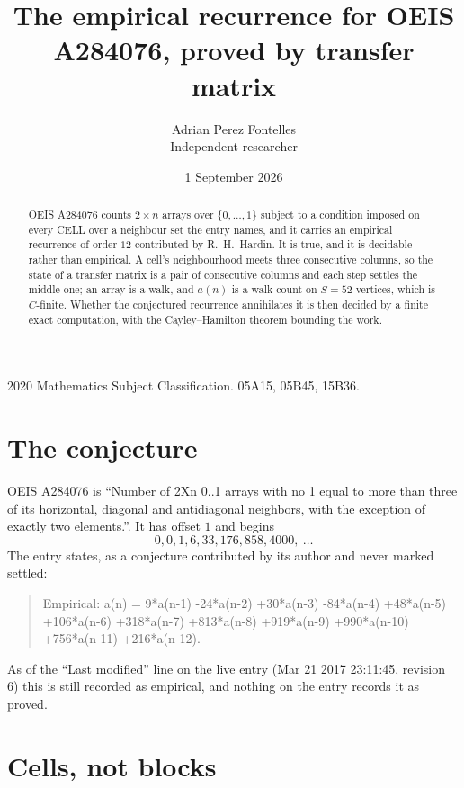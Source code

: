 \documentclass[11pt,a4paper]{article}
\title{The empirical recurrence for OEIS A284076, proved by transfer matrix}
\author{Adrian Perez Fontelles\\ \small Independent researcher}
\date{1 September 2026}
\theoremstyle{plain}
\theoremstyle{definition}
\begin{document}
\maketitle

\begin{abstract}
OEIS A284076 counts $2\times n$ arrays over $\{0,\dots,1\}$ subject to a condition imposed on
every CELL over a neighbour set the entry names, and it carries an empirical recurrence of
order $12$ contributed by R.~H.~Hardin. It is true, and it is decidable rather than
empirical. A cell's neighbourhood meets three consecutive columns, so the state of a transfer
matrix is a pair of consecutive columns and each step settles the middle one; an array is a
walk, and $a(n)$ is a walk count on $S=52$ vertices, which is $C$-finite. Whether the
conjectured recurrence annihilates it is then decided by a finite exact computation, with the
Cayley--Hamilton theorem bounding the work.
\end{abstract}

\noindent\small 2020 Mathematics Subject Classification. 05A15, 05B45, 15B36.\normalsize

\section{The conjecture}

OEIS A284076 is ``Number of 2Xn 0..1 arrays with no 1 equal to more than three of its horizontal, diagonal and antidiagonal neighbors, with the exception of exactly two elements.''. It has offset $1$ and begins
\[
0, 0, 1, 6, 33, 176, 858, 4000,\ \dots
\]
The entry states, as a conjecture contributed by its author and never marked settled:
\begin{quote}
Empirical: a(n) = 9*a(n-1) -24*a(n-2) +30*a(n-3) -84*a(n-4) +48*a(n-5) +106*a(n-6) +318*a(n-7) +813*a(n-8) +919*a(n-9) +990*a(n-10) +756*a(n-11) +216*a(n-12).
\end{quote}
As of the ``Last modified'' line on the live entry (Mar 21 2017 23:11:45, revision 6) this is still
recorded as empirical, and nothing on the entry records it as proved.

\section{Cells, not blocks}
\end{document}
